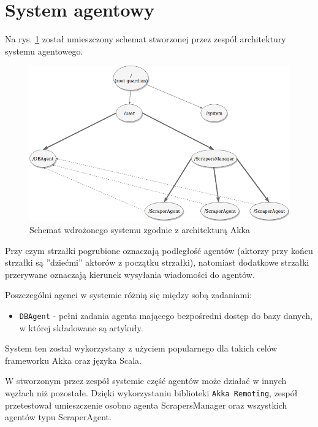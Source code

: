 \section{System agentowy}
Na rys. \ref{fig:actor} został umieszczony schemat stworzonej przez zespół architektury systemu agentowego.
\begin{figure}[!htb]
\centering
\includegraphics[width=1.0\textwidth]{./pict/actors.png}
\caption{Schemat wdrożonego systemu zgodnie z architekturą Akka}
\label{fig:actor}
\end{figure}

\par Przy czym strzałki pogrubione oznaczają podległość agentów (aktorzy przy końcu strzałki są ''dziećmi'' aktorów z początku strzałki), natomiast dodatkowe strzałki przerywane oznaczają kierunek wysyłania wiadomości do agentów.

\par Poszczególni agenci w systemie różnią się między sobą zadaniami:
\begin{itemize}
	\item \texttt{DBAgent} - pełni zadania agenta mającego bezpośredni dostęp do bazy danych, w której składowane są artykuły. 
\end{itemize}

\par System ten został wykorzystany z użyciem popularnego dla takich celów frameworku Akka oraz języka Scala.

W stworzonym przez zespół systemie część agentów może działać w innych węzłach niż pozostałe. Dzięki wykorzystaniu biblioteki \texttt{Akka Remoting}, zespół przetestował umieszczenie osobno agenta ScrapersManager oraz wszystkich agentów typu ScraperAgent.

